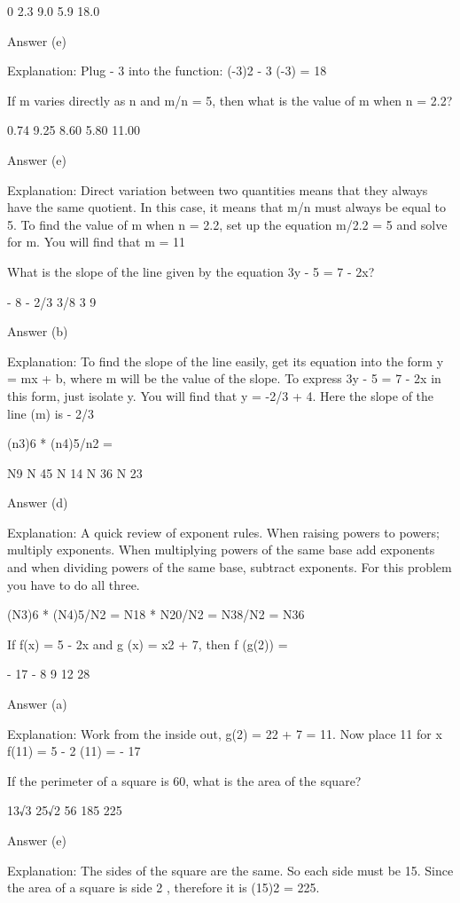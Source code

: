     0
    2.3
    9.0
    5.9
    18.0 

Answer (e)

Explanation: Plug - 3 into the function: (-3)2 - 3 (-3) = 18

If m varies directly as n and m/n = 5, then what is the value of m when n = 2.2?

    0.74
    9.25
    8.60
    5.80
    11.00 

Answer (e)

Explanation: Direct variation between two quantities means that they always have the same quotient. In this case, it means that m/n must always be equal to 5. To find the value of m when n = 2.2, set up the equation m/2.2 = 5 and solve for m. You will find that m = 11

What is the slope of the line given by the equation 3y - 5 = 7 - 2x?

    - 8
    - 2/3
    3/8
    3
    9 

Answer (b)

Explanation: To find the slope of the line easily, get its equation into the form y = mx + b, where m will be the value of the slope. To express 3y - 5 = 7 - 2x in this form, just isolate y. You will find that y = -2/3 + 4. Here the slope of the line (m) is - 2/3

(n3)6 * (n4)5/n2 =

    N9
    N 45
    N 14
    N 36
    N 23 

Answer (d)

Explanation: A quick review of exponent rules. When raising powers to powers; multiply exponents. When multiplying powers of the same base add exponents and when dividing powers of the same base, subtract exponents. For this problem you have to do all three.

(N3)6 * (N4)5/N2 = N18 * N20/N2 = N38/N2 = N36

If f(x) = 5 - 2x and g (x) = x2 + 7, then f (g(2)) =

    - 17
    - 8
    9
    12
    28 

Answer (a)

Explanation: Work from the inside out, g(2) = 22 + 7 = 11. Now place 11 for x f(11) = 5 - 2 (11) = - 17

If the perimeter of a square is 60, what is the area of the square?

    13√3
    25√2
    56
    185
    225 

Answer (e)

Explanation: The sides of the square are the same. So each side must be 15. Since the area of a square is side 2 , therefore it is (15)2 = 225.

